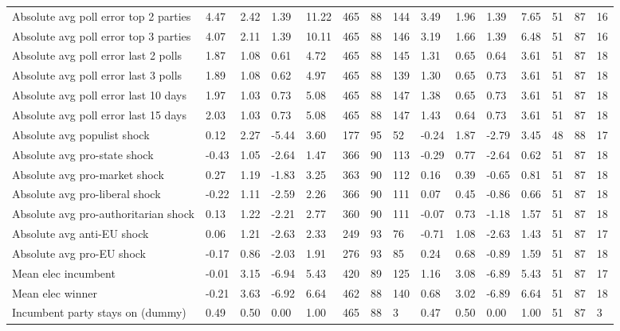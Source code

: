 \begin{longtable}{lllllllllllllll}
Absolute avg poll error top 2 parties & 4.47 & 2.42 & 1.39 & 11.22 & 465 & 88 & 144 & 3.49 & 1.96 & 1.39 & 7.65 & 51 & 87 & 16\\
Absolute avg poll error top 3 parties & 4.07 & 2.11 & 1.39 & 10.11 & 465 & 88 & 146 & 3.19 & 1.66 & 1.39 & 6.48 & 51 & 87 & 16\\
\addlinespace
Absolute avg poll error last 2 polls & 1.87 & 1.08 & 0.61 & 4.72 & 465 & 88 & 145 & 1.31 & 0.65 & 0.64 & 3.61 & 51 & 87 & 18\\
Absolute avg poll error last 3 polls & 1.89 & 1.08 & 0.62 & 4.97 & 465 & 88 & 139 & 1.30 & 0.65 & 0.73 & 3.61 & 51 & 87 & 18\\
Absolute avg poll error last 10 days & 1.97 & 1.03 & 0.73 & 5.08 & 465 & 88 & 147 & 1.38 & 0.65 & 0.73 & 3.61 & 51 & 87 & 18\\
Absolute avg poll error last 15 days & 2.03 & 1.03 & 0.73 & 5.08 & 465 & 88 & 147 & 1.43 & 0.64 & 0.73 & 3.61 & 51 & 87 & 18\\
Absolute avg populist shock & 0.12 & 2.27 & -5.44 & 3.60 & 177 & 95 & 52 & -0.24 & 1.87 & -2.79 & 3.45 & 48 & 88 & 17\\
\addlinespace
Absolute avg pro-state shock & -0.43 & 1.05 & -2.64 & 1.47 & 366 & 90 & 113 & -0.29 & 0.77 & -2.64 & 0.62 & 51 & 87 & 18\\
Absolute avg pro-market shock & 0.27 & 1.19 & -1.83 & 3.25 & 363 & 90 & 112 & 0.16 & 0.39 & -0.65 & 0.81 & 51 & 87 & 18\\
Absolute avg pro-liberal shock & -0.22 & 1.11 & -2.59 & 2.26 & 366 & 90 & 111 & 0.07 & 0.45 & -0.86 & 0.66 & 51 & 87 & 18\\
Absolute avg pro-authoritarian shock & 0.13 & 1.22 & -2.21 & 2.77 & 360 & 90 & 111 & -0.07 & 0.73 & -1.18 & 1.57 & 51 & 87 & 18\\
Absolute avg anti-EU shock & 0.06 & 1.21 & -2.63 & 2.33 & 249 & 93 & 76 & -0.71 & 1.08 & -2.63 & 1.43 & 51 & 87 & 17\\
\addlinespace
Absolute avg pro-EU shock & -0.17 & 0.86 & -2.03 & 1.91 & 276 & 93 & 85 & 0.24 & 0.68 & -0.89 & 1.59 & 51 & 87 & 18\\
Mean elec incumbent & -0.01 & 3.15 & -6.94 & 5.43 & 420 & 89 & 125 & 1.16 & 3.08 & -6.89 & 5.43 & 51 & 87 & 17\\
Mean elec winner & -0.21 & 3.63 & -6.92 & 6.64 & 462 & 88 & 140 & 0.68 & 3.02 & -6.89 & 6.64 & 51 & 87 & 18\\
Incumbent party stays on (dummy) & 0.49 & 0.50 & 0.00 & 1.00 & 465 & 88 & 3 & 0.47 & 0.50 & 0.00 & 1.00 & 51 & 87 & 3\\

\end{longtable}
